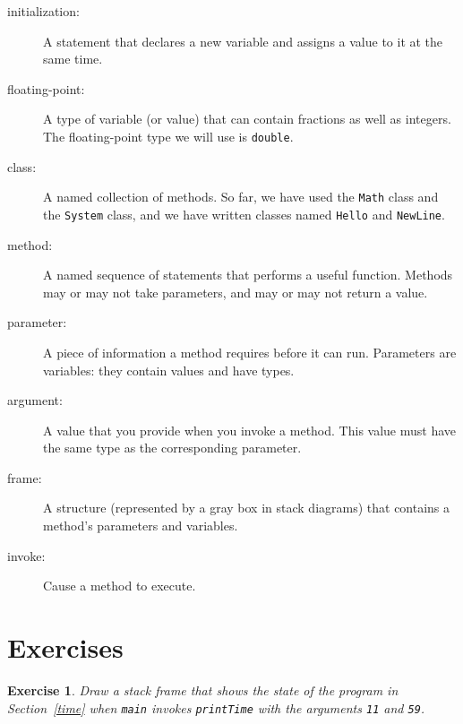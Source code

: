 \documentclass[12pt]{book}
\theoremstyle{exercise}
\newtheorem{exercise}{Exercise}[chapter]
\begin{document}
\begin{description}

\item[initialization:]  A statement that declares a new variable
and assigns a value to it at the same time.

\item[floating-point:] A type of variable (or value) that can contain
fractions as well as integers.  The floating-point type we will
use is {\tt double}.

\item[class:]  A named collection of methods.  So far, we have used
the {\tt Math} class and the {\tt System} class, and we have
written classes named {\tt Hello} and {\tt NewLine}.

\item[method:]  A named sequence of statements that performs a
useful function.  Methods may or may not take parameters, and may
or may not return a value.

\item[parameter:]  A piece of information a method requires before
it can run.  Parameters are variables: they contain values and have types.

\item[argument:]  A value that you provide when you invoke a
method.  This value must have the same type as the corresponding
parameter.

\item[frame:] A structure (represented by a gray box in stack diagrams)
that contains a method's parameters and variables.

\item[invoke:]  Cause a method to execute.


\end{description}

\section{Exercises}

\begin{exercise}

Draw a stack frame that shows the state of the program in Section~\ref{time}
when {\tt main} invokes {\tt printTime}
with the arguments {\tt 11} and {\tt 59}.

\end{exercise}
\end{document}

